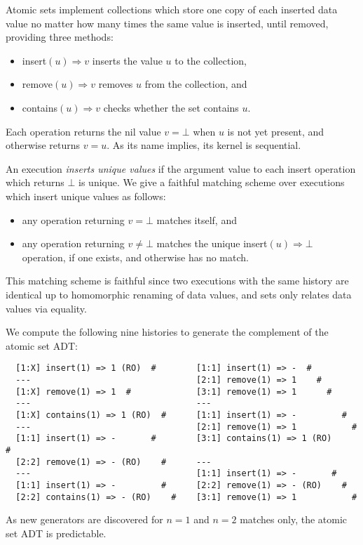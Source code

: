 Atomic sets implement collections which store one copy of each inserted data
value no matter how many times the same value is inserted, until removed,
providing three methods:
\begin{itemize}

  \item insert$(u) \Rightarrow v$ inserts the value $u$ to the collection,

  \item remove$(u) \Rightarrow v$ removes $u$ from the collection, and

  \item contains$(u) \Rightarrow v$ checks whether the set contains $u$.

\end{itemize}
Each operation returns the nil value $v = \mathord\perp$ when $u$ is not yet
present, and otherwise returns $v = u$. As its name implies, its kernel is
sequential.

An execution \emph{inserts unique values} if the argument value to each insert
operation which returns $\mathord\perp$ is unique. We give a faithful matching
scheme over executions which insert unique values as follows:
\begin{itemize}

  \item any operation returning $v = \mathord\perp$ matches itself, and

  \item any operation returning $v \neq \mathord\perp$ matches the unique
  insert$(u) \Rightarrow \mathord\perp$ operation, if one exists, and otherwise
  has no match.

\end{itemize}
This matching scheme is faithful since two executions with the same history are
identical up to homomorphic renaming of data values, and sets only relates data
values via equality.

We compute the following nine histories to generate the complement of the
atomic set ADT:
\begin{verbatim}
  [1:X] insert(1) => 1 (RO)  #        [1:1] insert(1) => -  #
  ---                                 [2:1] remove(1) => 1    #
  [1:X] remove(1) => 1  #             [3:1] remove(1) => 1      #
  ---                                 ---
  [1:X] contains(1) => 1 (RO)  #      [1:1] insert(1) => -         #
  ---                                 [2:1] remove(1) => 1           #
  [1:1] insert(1) => -       #        [3:1] contains(1) => 1 (RO)      #
  [2:2] remove(1) => - (RO)    #      ---
  ---                                 [1:1] insert(1) => -       #
  [1:1] insert(1) => -         #      [2:2] remove(1) => - (RO)    #
  [2:2] contains(1) => - (RO)    #    [3:1] remove(1) => 1           #
\end{verbatim}
As new generators are discovered for $n=1$ and $n=2$ matches only, the atomic
set ADT is predictable.

